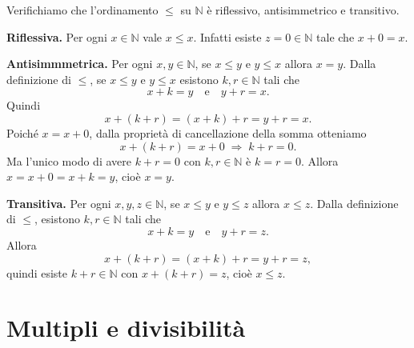 \begin{esempio}
Verifichiamo che l'ordinamento \(\leq\) su \(\mathbb{N}\) è riflessivo, antisimmetrico e transitivo.

\textbf{Riflessiva.}
Per ogni \(x \in \mathbb{N}\) vale \(x \leq x\).
Infatti esiste \(z = 0 \in \mathbb{N}\) tale che \(x + 0 = x\).

\medskip
\textbf{Antisimmmetrica.}
Per ogni \(x, y \in \mathbb{N}\), se \(x \leq y\) e \(y \leq x\) allora \(x = y\).
Dalla definizione di \(\leq\), se \(x \leq y\) e \(y \leq x\) esistono \(k, r \in \mathbb{N}\) tali che
\[
x + k = y \quad \text{e} \quad y + r = x.
\]
Quindi
\[
x + (k + r) = (x + k) + r = y + r = x.
\]
Poiché \(x = x + 0\), dalla proprietà di cancellazione della somma otteniamo
\[
x + (k + r) = x + 0 \;\Rightarrow\; k + r = 0.
\]
Ma l’unico modo di avere \(k + r = 0\) con \(k, r \in \mathbb{N}\) è \(k = r = 0\).
Allora \(x = x + 0 = x + k = y\), cioè \(x = y\).

\medskip
\textbf{Transitiva.}
Per ogni \(x, y, z \in \mathbb{N}\), se \(x \leq y\) e \(y \leq z\) allora \(x \leq z\).
Dalla definizione di \(\leq\), esistono \(k, r \in \mathbb{N}\) tali che
\[
x + k = y \quad \text{e} \quad y + r = z.
\]
Allora
\[
x + (k + r) = (x + k) + r = y + r = z,
\]
quindi esiste \(k + r \in \mathbb{N}\) con \(x + (k + r) = z\), cioè \(x \leq z\).
\end{esempio}

\section{Multipli e divisibilità}




